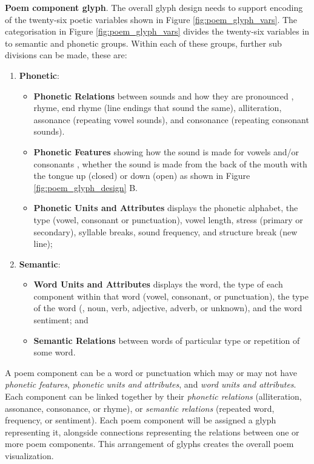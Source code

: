 \textbf{Poem component glyph}. The overall glyph design needs to support encoding of the twenty-six poetic variables shown in Figure \ref{fig:poem_glyph_vars}.
The categorisation in Figure \ref{fig:poem_glyph_vars} divides the twenty-six variables in to semantic and phonetic groups.
Within each of these groups, further sub divisions can be made, these are:

\begin{enumerate}
\item\textbf{Phonetic}:
\begin{itemize}
\item \textbf{Phonetic Relations} between sounds and how they are pronounced \eg, rhyme, end rhyme (line endings that sound the same), alliteration, assonance (repeating vowel sounds), and consonance (repeating consonant sounds). 
\item \textbf{Phonetic Features} showing how the sound is made for vowels and/or consonants \eg, whether the sound is made from the back of the mouth with the tongue up (closed) or down (open) as shown in Figure \ref{fig:poem_glyph_design} B.
\item \textbf{Phonetic Units and Attributes} displays the phonetic alphabet, the type (vowel, consonant or punctuation), vowel length, stress (primary or secondary), syllable breaks, sound frequency, and structure break (new line);
\end{itemize}
\item\textbf{Semantic}:
\begin{itemize}
\item \textbf{Word Units and Attributes} displays the word, the type of each component within that word (vowel, consonant, or punctuation), the type of the word (\eg, noun, verb, adjective, adverb, or unknown), and the word sentiment; and
\item \textbf{Semantic Relations} between words of particular type or repetition of some word.
\end{itemize}
\end{enumerate}

A poem component can be a word or punctuation which may or may not have \emph{phonetic features}, \emph{phonetic units and attributes}, and \emph{word units and attributes}.
Each component can be linked together by their \emph{phonetic relations} (alliteration, assonance, consonance, or rhyme), or \emph{semantic relations} (repeated word, frequency, or sentiment).
Each poem component will be assigned a glyph representing it, alongside connections representing the relations between one or more poem components. 
This arrangement of glyphs creates the overall poem visualization.

